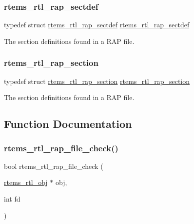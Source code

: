 \subsubsection{\texorpdfstring{rtems\_rtl\_rap\_sectdef}{rtems\_rtl\_rap\_sectdef}}
{\footnotesize\ttfamily typedef struct \mbox{\hyperlink{structrtems__rtl__rap__sectdef}{rtems\+\_\+rtl\+\_\+rap\+\_\+sectdef}}  \mbox{\hyperlink{structrtems__rtl__rap__sectdef}{rtems\+\_\+rtl\+\_\+rap\+\_\+sectdef}}}

The section definitions found in a R\+AP file. \mbox{\label{rtl-rap_8c_a50343088766a6a267bf105074d0d485b}} 
\subsubsection{\texorpdfstring{rtems\_rtl\_rap\_section}{rtems\_rtl\_rap\_section}}
{\footnotesize\ttfamily typedef struct \mbox{\hyperlink{structrtems__rtl__rap__section}{rtems\+\_\+rtl\+\_\+rap\+\_\+section}}  \mbox{\hyperlink{structrtems__rtl__rap__section}{rtems\+\_\+rtl\+\_\+rap\+\_\+section}}}

The section definitions found in a R\+AP file. 

\subsection{Function Documentation}
\mbox{\label{rtl-rap_8c_a1c969535841d803fd98b4b8f518daf79}} 
\subsubsection{\texorpdfstring{rtems\_rtl\_rap\_file\_check()}{rtems\_rtl\_rap\_file\_check()}}
{\footnotesize\ttfamily bool rtems\+\_\+rtl\+\_\+rap\+\_\+file\+\_\+check (\begin{DoxyParamCaption}\item[{\mbox{\hyperlink{structrtems__rtl__obj}{rtems\+\_\+rtl\+\_\+obj}} $\ast$}]{obj,  }\item[{int}]{fd }\end{DoxyParamCaption})}

